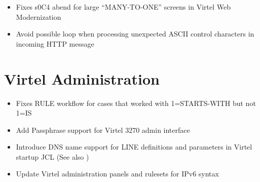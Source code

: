 \documentclass[letterpaper,10pt,english]{sphinxmanual}
\begin{document}
\begin{itemize}
\item {} 
Fixes s0C4 abend for large “MANY-TO-ONE” screens in Virtel Web Modernization

\end{itemize}

\begin{itemize}
\item {} 
Avoid possible loop when processing unexpected ASCII control characters in incoming HTTP message

\end{itemize}

\newpage


\section{Virtel Administration}
\label{\detokenize{TN202003:virtel-administration}}
\begin{itemize}
\item {} 
Fixes RULE workflow for cases that worked with 1=STARTS-WITH but not 1=IS

\end{itemize}

\begin{itemize}
\item {} 
Add Passphrase support for Virtel 3270 admin interface

\end{itemize}

\begin{itemize}
\item {} 
Introduce DNS name support for LINE definitions and parameters in Virtel startup JCL (See also )

\end{itemize}

\begin{itemize}
\item {} 
Update Virtel administration panels and rulesets for IPv6 syntax

\end{itemize}
\end{document}
